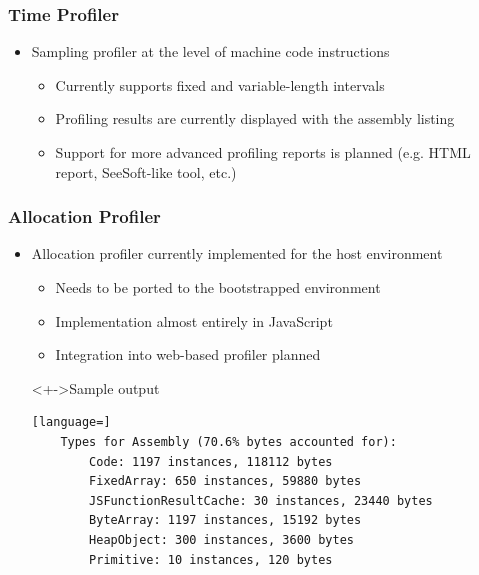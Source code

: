 \begin{frame}
\frametitle{\bf Time Profiler}

    \begin{itemize}
        \item Sampling profiler at the level of machine code instructions
        \begin{itemize}
            \item Currently supports fixed and variable-length intervals
            \item Profiling results are currently displayed with the assembly listing
            \item Support for more advanced profiling reports is planned (e.g. HTML report, SeeSoft-like tool, etc.)
        \end{itemize}
    \end{itemize}

\end{frame}

\begin{frame}[fragile]
\frametitle{\bf Allocation Profiler}

\begin{itemize}
    \item Allocation profiler currently implemented for the host environment
    \begin{itemize}
        \item Needs to be ported to the bootstrapped environment
        \item Implementation almost entirely in JavaScript
        \item Integration into web-based profiler planned
    \end{itemize}
    \begin{block}<+->{Sample output}
    \begin{lstlisting}[language=]
    Types for Assembly (70.6% bytes accounted for):
        Code: 1197 instances, 118112 bytes
        FixedArray: 650 instances, 59880 bytes
        JSFunctionResultCache: 30 instances, 23440 bytes
        ByteArray: 1197 instances, 15192 bytes
        HeapObject: 300 instances, 3600 bytes
        Primitive: 10 instances, 120 bytes
    \end{lstlisting}
    \end{block}
\end{itemize}
\end{frame}

